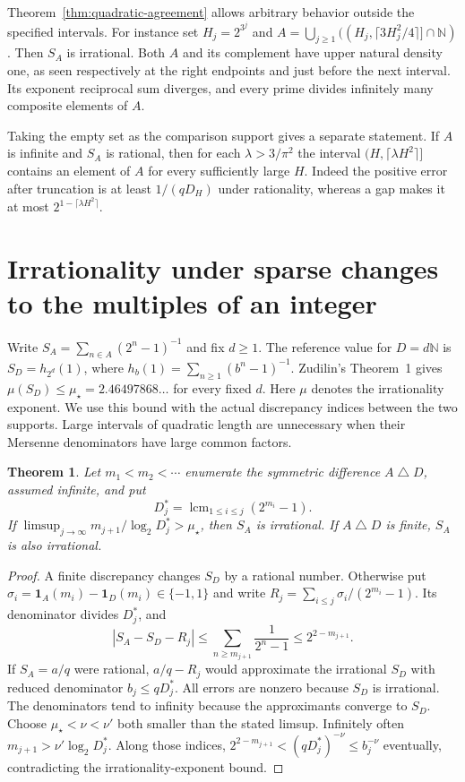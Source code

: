 \documentclass[11pt,letterpaper]{article}
\newtheorem{theorem}{Theorem}[section]
\newcommand{\N}{\mathbb N}
\begin{document}
Theorem~\ref{thm:quadratic-agreement} allows arbitrary behavior outside the specified intervals. For instance set $H_j=2^{3^j}$ and
$A=\bigcup_{j\ge1}((H_j,\lceil3H_j^2/4\rceil]\cap\N)$. Then $S_A$ is irrational. Both $A$ and its complement have upper natural density one, as seen respectively at the right endpoints and just before the next interval. Its exponent reciprocal sum diverges, and every prime divides infinitely many composite elements of $A$.

Taking the empty set as the comparison support gives a separate statement. If $A$ is infinite and $S_A$ is rational, then for each $\lambda>3/\pi^2$ the interval $(H,\lceil\lambda H^2\rceil]$ contains an element of $A$ for every sufficiently large $H$. Indeed the positive error after truncation is at least $1/(qD_H)$ under rationality, whereas a gap makes it at most $2^{1-\lceil\lambda H^2\rceil}$.

\section{Irrationality under sparse changes to the multiples of an integer}
\label{sec:discrepancy-denominators}
Write $S_A=\sum_{n\in A}(2^n-1)^{-1}$ and fix $d\ge1$.
The reference value for $D=d\mathbb N$ is
$S_D=h_{2^d}(1)$, where
$h_b(1)=\sum_{n\ge1}(b^n-1)^{-1}$.
Zudilin's Theorem~1 \cite{zu} gives
$\mu(S_D)\le\mu_\star=2.46497868\ldots$ for every fixed $d$.
Here $\mu$ denotes the irrationality exponent. We use this bound with the
actual discrepancy indices between the two supports. Large intervals of
quadratic length are unnecessary when their Mersenne denominators have
large common factors.

\begin{theorem}\label{thm:support-denominators}
Let $m_1<m_2<\cdots$ enumerate the symmetric difference
$A\mathbin{\triangle}D$, assumed infinite, and put
\[
 D_j^*=\operatorname{lcm}_{1\le i\le j}(2^{m_i}-1).
\]
If $\limsup_{j\to\infty} m_{j+1}/\log_2 D_j^*>\mu_\star$, then
$S_A$ is irrational. If $A\mathbin{\triangle}D$ is finite,
$S_A$ is also irrational.
\end{theorem}

\begin{proof}
A finite discrepancy changes $S_D$ by a rational number. Otherwise put
$\sigma_i=\mathbf1_A(m_i)-\mathbf1_D(m_i)\in\{-1,1\}$ and write
$R_j=\sum_{i\le j}\sigma_i/(2^{m_i}-1)$.
Its denominator divides $D_j^*$, and
\[
 |S_A-S_D-R_j|
 \le \sum_{n\ge m_{j+1}}\frac1{2^n-1}
 \le 2^{2-m_{j+1}}.
\]
If $S_A=a/q$ were rational, $a/q-R_j$ would approximate the
irrational $S_D$ with reduced denominator $b_j\le qD_j^*$.
All errors are nonzero because $S_D$ is irrational.
The denominators tend to infinity because the approximants converge
to $S_D$. Choose $\mu_\star<\nu<\nu'$ both smaller than the stated
limsup. Infinitely often $m_{j+1}>\nu'\log_2 D_j^*$. Along those
indices, $2^{2-m_{j+1}}<(qD_j^*)^{-\nu}\le b_j^{-\nu}$
eventually, contradicting the irrationality-exponent bound.
\end{proof}
\end{document}
